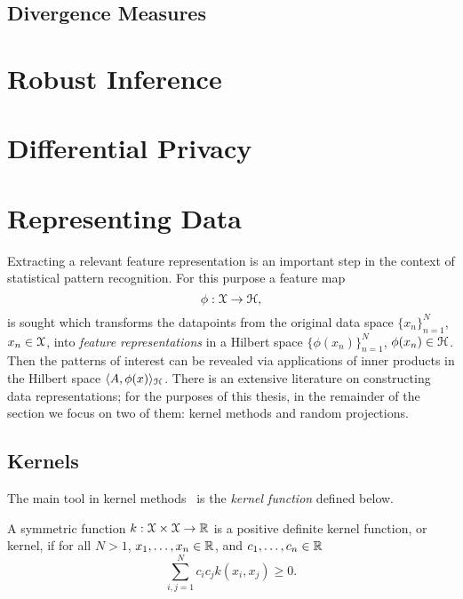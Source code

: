 \subsection{Divergence Measures}
\label{subsec:b-divergences}

\section{Robust Inference}
\label{sec:b-robust-inference}

\section{Differential Privacy}
\label{sec:b-differential-privacy}

\section{Representing Data}
\label{sec:b-representing-data}
Extracting a relevant feature representation is an important step in the context of statistical pattern recognition. For this purpose a feature map 
\[
\phi: \mathcal{X} \rightarrow \mathcal{H},
\]
is sought which transforms the datapoints from the original data space $\{x_n\}_{n=1}^{N}$, $x_n \in \mathcal{X}$, into \emph{feature representations} in a Hilbert space $\{\phi(x_n)\}_{n=1}^{N}$, $\phi(x_n) \in \mathcal{H}$. Then the patterns of interest can be revealed via applications of inner products in the Hilbert space $\langle A, \phi(x) \rangle_{\mathcal{H}}$. There is an extensive literature on constructing data representations; for the purposes of this thesis, in the remainder of the section we focus on two of them: kernel methods and random projections.


\subsection{Kernels}
\label{subsec:b-kernels}

The main tool in kernel methods~\cite{scholkopf02} is the \emph{kernel function} defined below.

\begin{ndefn} \label{def:bkernelfun}
	A symmetric function $k: \mathcal{X} \times \mathcal{X} \rightarrow \mathbb{R} $ is a positive definite kernel function, or kernel, if for all $N>1$, $x_1, \ldots, x_n \in \mathbb{R}$, and $c_1, \ldots, c_n \in \mathbb{R}$ 
	\[
	\sum_{i,j=1}^{N} c_ic_j k(x_i, x_j) \geq 0.
	\]
\end{ndefn}

